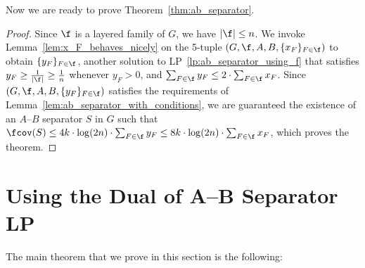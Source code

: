 Now we are ready to prove Theorem~\ref{thm:ab_separator}.

\ABSeparatorRounding*
\begin{proof}
    Since $\f$ is a layered family of $G$, we have $|\f| \leq n$. We invoke Lemma~\ref{lem:x_F_behaves_nicely} on the 5-tuple $(G, \f, A, B, \{x_F\}_{F \in \f})$ to obtain $\{y_F\}_{F \in \f}$, another solution to LP~\ref{lp:ab_separator_using_f} that satisfies $y_F \geq \frac{1}{|\f|} \geq \frac{1}{n}$ whenever $y_F > 0$, and $\sum_{F \in \f} y_F \leq 2 \cdot \sum_{F \in \f} x_F$. Since $(G,\f,A,B,\{y_F\}_{F \in \f})$ satisfies the requirements of Lemma~\ref{lem:ab_separator_with_conditions}, we are guaranteed the existence of an $A$--$B$ separator $S$ in $G$ such that $\fcov(S) \leq 4k \cdot \log(2n) \cdot \sum_{F \in \f} y_F \leq 8k \cdot \log(2n) \cdot \sum_{F \in \f} x_F$, which proves the theorem.
\end{proof}

\section{Using the Dual of A--B Separator LP}\label{sec:rounding_dual_ab_sep}
The main theorem that we prove in this section is the following:

